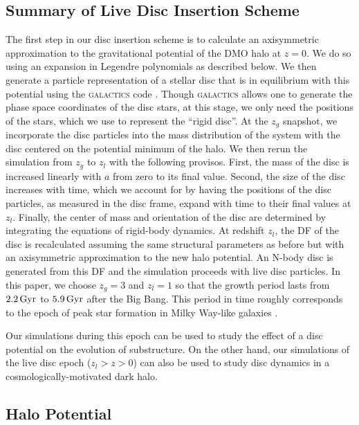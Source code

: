 \vspace{0.1in}
\subsection{Summary of Live Disc Insertion
  Scheme} \label{sec:method_outline}

The first step in our disc insertion scheme is to calculate an
axisymmetric approximation to the gravitational potential of the DMO
halo at $z=0$.  We do so using an expansion in Legendre polynomials as
described below.  We then generate a particle representation of a
stellar disc that is in equilibrium with this potential using the
\textsc{galactics} code
\citep{KGGalactICSReference,WPDGalactICSReference}.  Though
\textsc{galactics} allows one to generate the phase space coordinates
of the disc stars, at this stage, we only need the positions of the
stars, which we use to represent the ``rigid disc''.  At the $z_g$
snapshot, we incorporate the disc particles into the mass distribution
of the system with the disc centered on the potential minimum of the
halo.  We then rerun the simulation from $z_g$ to $z_l$ with the
following provisos.  First, the mass of the disc is increased linearly
with $a$ from zero to its final value.  Second, the size of the disc
increases with time, which we account for by having the positions of
the disc particles, as measured in the disc frame, expand with time to
their final values at $z_l$.  Finally, the center of mass and
orientation of the disc are determined by integrating the equations of
rigid-body dynamics.  At redshift $z_l$, the DF of the disc is
recalculated assuming the same structural parameters as before but
with an axisymmetric approximation to the new halo potential.  An
N-body disc is generated from this DF and the simulation proceeds with
live disc particles.  In this paper, we choose $z_g = 3$ and $z_l = 1$
so that the growth period lasts from $2.2\,{\rm Gyr}$ to
$5.9\,{\rm Gyr}$ after the Big Bang.  This period in time roughly
corresponds to the epoch of peak star formation in Milky Way-like
galaxies \citep[e.g.][]{van_dokkum_etal_2013}.

Our simulations during this epoch can be used to study the effect of a
disc potential on the evolution of substructure.  On the other hand,
our simulations of the live disc epoch ($z_l > z > 0$) can also be used to
study disc dynamics in a cosmologically-motivated dark halo.

\subsection{Halo Potential} \label{sec:ext_disk_pot}

